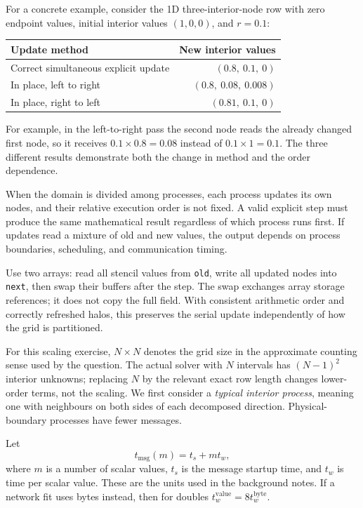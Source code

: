 For a concrete example, consider the 1D three-interior-node row with zero endpoint values,
initial interior values $(1,0,0)$, and $r=0.1$:
\begin{center}
\begin{tabular}{lr}
\toprule
Update method & New interior values\\
\midrule
Correct simultaneous explicit update & $(0.8,\ 0.1,\ 0)$\\
In place, left to right & $(0.8,\ 0.08,\ 0.008)$\\
In place, right to left & $(0.81,\ 0.1,\ 0)$\\
\bottomrule
\end{tabular}
\end{center}
For example, in the left-to-right pass the second node reads the already changed first node,
so it receives $0.1\times0.8=0.08$ instead of $0.1\times1=0.1$.
The three different results demonstrate both the change in method and the order dependence.

When the domain is divided among processes, each process updates its own nodes, and their
relative execution order is not fixed. A valid explicit step must produce the same mathematical
result regardless of which process runs first. If updates read a mixture of old and new values,
the output depends on process boundaries, scheduling, and communication timing.

Use two arrays: read all stencil values from \texttt{old}, write all updated nodes into
\texttt{next}, then swap their buffers after the step. The swap exchanges array storage references;
it does not copy the full field. With consistent arithmetic order and correctly refreshed halos,
this preserves the serial update independently of how the grid is partitioned.

For this scaling exercise, $N\times N$ denotes the grid size in the approximate counting sense
used by the question. The actual solver with $N$ intervals has $(N-1)^2$ interior unknowns;
replacing $N$ by the relevant exact row length changes lower-order terms, not the scaling.
We first consider a \emph{typical interior process}, meaning one with neighbours on both sides
of each decomposed direction. Physical-boundary processes have fewer messages.

Let
\[
t_{\mathrm{msg}}(m)=t_s+m t_w,
\]
where $m$ is a number of scalar values, $t_s$ is the message startup time, and $t_w$ is time
per scalar value. These are the units used in the background notes. If a network fit uses
bytes instead, then for doubles $t_w^{\mathrm{value}}=8t_w^{\mathrm{byte}}$.

